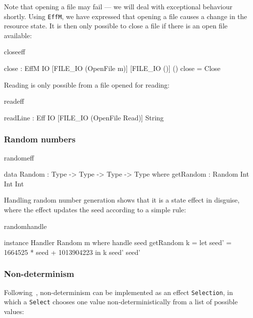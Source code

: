 \noindent
Note that opening a file may fail --- we will deal with exceptional behaviour
shortly. 
Using \texttt{EffM}, we have expressed that opening a file causes a change in the
resource state.
It is then only possible to close a file if there is an open file
available:

\begin{SaveVerbatim}{closeeff}

close : EffM IO [FILE_IO (OpenFile m)] [FILE_IO ()] ()
close = Close

\end{SaveVerbatim}

\noindent
Reading is only possible from a file opened for reading:

\begin{SaveVerbatim}{readeff}

readLine : Eff IO [FILE_IO (OpenFile Read)] String

\end{SaveVerbatim}
\subsubsection{Random numbers}

\begin{SaveVerbatim}{randomeff}

data Random : Type -> Type -> Type -> Type where
     getRandom : Random Int Int Int

\end{SaveVerbatim}

\noindent
Handling random number generation shows that it is a state effect in
disguise, where the effect updates the seed according to a simple rule:

\begin{SaveVerbatim}{randomhandle}

instance Handler Random m where
    handle seed getRandom k
         = let seed' = 1664525 * seed + 1013904223 in
               k seed' seed'

\end{SaveVerbatim}

\subsubsection{Non-determinism}

Following~\cite{Bauer},
non-determinism can be implemented as an effect \texttt{Selection},
in which a \texttt{Select} chooses one value non-deterministically
from a list of possible values:

